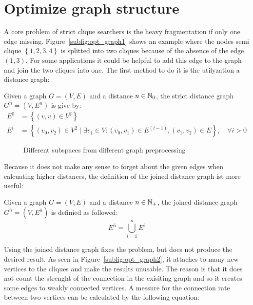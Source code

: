 \section{Optimize graph structure}
A core problem of strict clique searchers is the heavy fragmentation if only one edge missing. Figure~\ref{subfig:opt_graph1} shows an example where the nodes semi clique $\left\{1,2,3,4\right\}$ is splitted into two cliques because of the absence of the edge $(1,3)$. For some applications it could be helpful to add this edge to the graph and join the two cliques into one. The first method to do it is the utilyzation a distance graph:
\begin{envdef}
	Given a graph $G=(V,E)$ and a distance $n \in \mathbb{N}_0$, the strict distance graph $G^n=(V,E^n)$ is give by:
	\begin{align}
		E^0 &= \left\{ (v,v) \in V^2 \right\}\\
		E^i &= \left\{ (v_0,v_2) \in V^2 \mid \exists v_1 \in V : (v_0,v_1) \in E^{(i-1)}, (v_1,v_2) \in E \right\}, \quad \forall i>0
	\end{align}
\end{envdef}
\begin{figure}
	\caption{Different subspaces from different graph preprocessing}
	\label{fig:opt_graph}
	\centering
	\hfill
	\hfill
	\subfloat[\label{subfig:opt_graph3}Filtered distance with $\alpha=\frac23$]{}
	\hfill
	\subfloat[\label{subfig:opt_graph4}Bidirectional filtered distance with $\alpha=\frac23$]{}
\end{figure}
Because it does not make any sense to forget about the given edges when calcuating higher distances, the definition of the joined distance graph ist more useful:
\begin{envdef}
	Given a graph $G=(V,E)$ and a distance $n \in \mathbb{N}_+$, the joined distance graph $G^{\overline{n}}=(V,E^{\overline{n}})$ is definied as followed:
	\begin{equation}
		E^{\overline{n}} = \bigcup_{i=1}^n E^i
	\end{equation}
\end{envdef}
Using the joined distance graph fixes the problem, but does not produce the desired result. As seen in Figure~\ref{subfig:opt_graph2}, it attaches to many new vertices to the cliques and make the results unusable. The reason is that it does not count the strenght of the connection in the exisiting graph and so it creates some edges to weakly connected vertices. A messure for the connection rate between two vertices can be calculated by the following equation:
